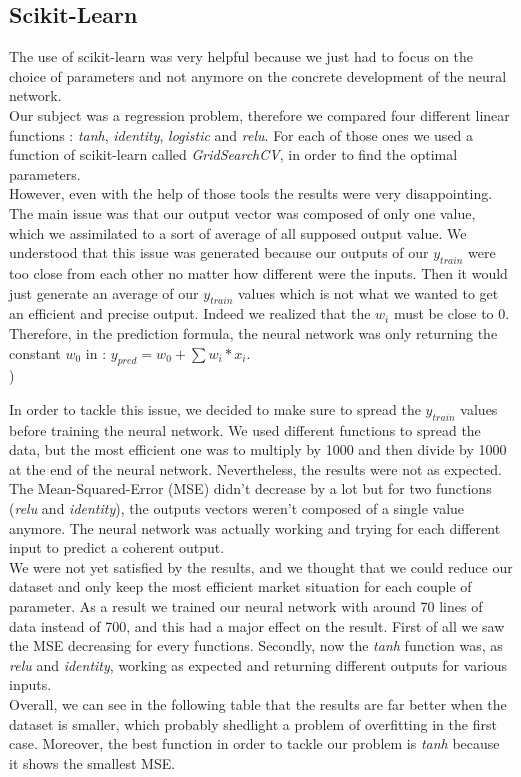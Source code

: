 \documentclass[]{article}
\begin{document}
\subsection{Scikit-Learn}
\vskip 0.5cm
The use of scikit-learn was very helpful because we just had to focus on the choice of parameters and not anymore on the concrete development of the neural network.\\
Our subject was a regression problem, therefore we compared four different linear functions : \textit{tanh}, \textit{identity}, \textit{logistic} and \textit{relu}.
For each of those ones we used a function of scikit-learn called \textit{GridSearchCV}, in order to find the optimal parameters. \\
However, even with the help of those tools the results were very disappointing. The main issue was that our output vector was composed of only one value, which we assimilated to a sort of average of all supposed output value. We understood that this issue was generated because our outputs of our $y_{train}$ were too close from each other no matter how different were the inputs. Then it would just generate an average of our $y_{train}$ values which is not what we wanted to get an efficient and precise output.  Indeed we realized that the \(w_{i}\) must be close to 0. Therefore, in the prediction formula, the neural network was only returning the constant \(w_{0}\) in : \(y_{pred} = w_{0} + \sum w_{i}*x_{i}\).\\)

In order to tackle this issue, we decided to make sure to spread the \(y_{train}\) values before training the neural network. We used different functions to spread the data, but the most efficient one was to multiply by 1000 and then divide by 1000 at the end of the neural network. Nevertheless, the results were not as expected. The Mean-Squared-Error (MSE) didn't decrease by a lot but for two functions (\textit{relu} and \textit{identity}), the outputs vectors weren't composed of a single value anymore. The neural network was actually working and trying for each different input to predict a coherent output.\\
We were not yet satisfied by the results, and we thought that we could reduce our dataset and only keep the most efficient market situation for each couple of parameter. As a result we trained our neural network with around 70 lines of data instead of 700, and this had a major effect on the result. First of all we saw the MSE decreasing for every functions. Secondly, now the \textit{tanh} function was, as \textit{relu} and \textit{identity}, working as expected and returning different outputs for various inputs. \\
Overall, we can see in the following table that the results are far better when the dataset is smaller, which probably shedlight a problem of overfitting in the first case. Moreover, the best function in order to tackle our problem is \textit{tanh} because it shows the smallest MSE.\\
\end{document}
